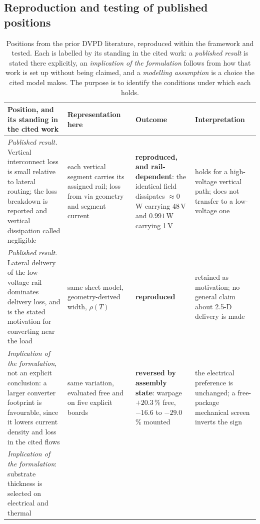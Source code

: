 \documentclass[journal]{IEEEtran}
\begin{document}
\subsection{Reproduction and testing of published positions}
\begin{table}[!t]
\caption{Positions from the prior DVPD literature, reproduced within the framework and tested.
Each is labelled by its standing in the cited work: a \emph{published result} is stated there
explicitly, an \emph{implication of the formulation} follows from how that work is set up
without being claimed, and a \emph{modelling assumption} is a choice the cited model makes.
The purpose is to identify the conditions under which each holds.}
\label{tab:prior}
\centering
\scriptsize
\setlength{\tabcolsep}{4pt}
\begin{tabular}{@{}p{4.5cm}p{3.9cm}p{3.7cm}p{4.5cm}@{}}
\toprule
Position, and its standing in the cited work & Representation here & Outcome & Interpretation \\
\midrule
\emph{Published result.} Vertical interconnect loss is small relative to lateral routing; the
loss breakdown is reported and vertical dissipation called negligible
\cite{VPD2023Architectures,Krishnakumar2026DVPD,Sriharini_ECTC_24,ISCAS2024DVPD}
& each vertical segment carries its assigned rail; loss from via geometry and segment current
& \textbf{reproduced, and rail-dependent}: the identical field dissipates $\approx0$\,W carrying 48\,V and $0.991$\,W carrying 1\,V
& holds for a high-voltage vertical path; does not transfer to a low-voltage one \\
\emph{Published result.} Lateral delivery of the low-voltage rail dominates delivery loss, and
is the stated motivation for converting near the load
\cite{VPD2023Architectures,Krishnakumar2026DVPD,Sriharini_ECTC_24,ISCAS2024DVPD}
& same sheet model, geometry-derived width, $\rho(T)$
& \textbf{reproduced}
& retained as motivation; no general claim about 2.5-D delivery is made \\
\emph{Implication of the formulation}, not an explicit conclusion: a larger converter footprint
is favourable, since it lowers current density and loss in the cited flows
\cite{Krishnakumar2026DVPD,ISCAS2024DVPD}
& same variation, evaluated free and on five explicit boards
& \textbf{reversed by assembly state}: warpage $+20.3$\,\% free, $-16.6$ to $-29.0$\,\% mounted
& the electrical preference is unchanged; a free-package mechanical screen inverts the sign \\
\emph{Implication of the formulation}: substrate thickness is selected on electrical and thermal

\end{tabular}
\end{table}
\end{document}
